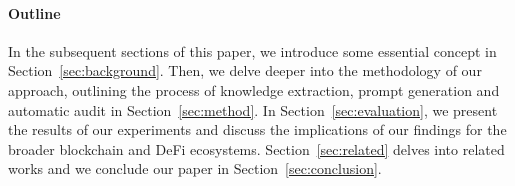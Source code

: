 \paragraph{Outline} In the subsequent sections of this paper, we introduce some essential concept in Section~\ref{sec:background}. Then, we delve deeper into the methodology of our approach, outlining the process of knowledge extraction, prompt generation and automatic audit in Section~\ref{sec:method}.
In Section~\ref{sec:evaluation}, we present the results of our experiments and discuss the implications of our findings for the broader blockchain and DeFi ecosystems. Section~\ref{sec:related} delves into related works and we conclude our paper in Section~\ref{sec:conclusion}.